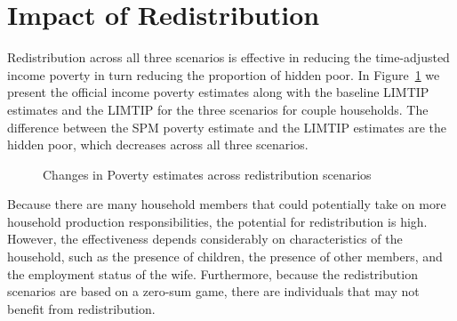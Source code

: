 \documentclass[
  11pt,
]{article}
\begin{document}
\section{Impact of Redistribution}\label{impact-of-redistribution}

Redistribution across all three scenarios is effective in reducing the
time-adjusted income poverty in turn reducing the proportion of hidden
poor. In Figure~\ref{fig-limtip} we present the official income poverty
estimates along with the baseline LIMTIP estimates and the LIMTIP for
the three scenarios for couple households. The difference between the
SPM poverty estimate and the LIMTIP estimates are the hidden poor, which
decreases across all three scenarios.

\begin{figure}[H]


\caption{\label{fig-limtip}Changes in Poverty estimates across
redistribution scenarios}

\end{figure}%

Because there are many household members that could potentially take on
more household production responsibilities, the potential for
redistribution is high. However, the effectiveness depends considerably
on characteristics of the household, such as the presence of children,
the presence of other members, and the employment status of the wife.
Furthermore, because the redistribution scenarios are based on a
zero-sum game, there are individuals that may not benefit from
redistribution.
\end{document}
